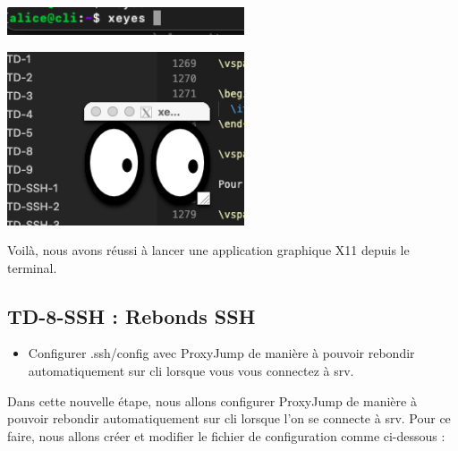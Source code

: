 \documentclass[12pt]{article}
\begin{document}
\vspace{0.3cm}

\begin{center}
  \includegraphics[width=7cm]{Images-Client-SSH/Image-TD-SSH-7/Commande-xeyes.png}
\end{center}

\vspace{0.3cm}

\begin{center}
  \includegraphics[width=7cm]{Images-Client-SSH/Image-TD-SSH-7/Application-X11.png}
\end{center}

\vspace{0.3cm}

Voilà, nous avons réussi à lancer une application graphique X11 depuis le terminal.

\newpage

\subsection{TD-8-SSH : Rebonds SSH}

\vspace{0.3cm}

\begin{itemize}
  \item Configurer .ssh/config avec ProxyJump de manière à pouvoir rebondir automatiquement sur cli lorsque vous vous connectez à srv.
\end{itemize}

\vspace{0.3cm}

Dans cette nouvelle étape, nous allons configurer ProxyJump de manière à pouvoir rebondir automatiquement sur cli lorsque l'on se connecte à srv. Pour ce faire, nous allons créer et modifier le fichier de configuration comme ci-dessous :
\end{document}

